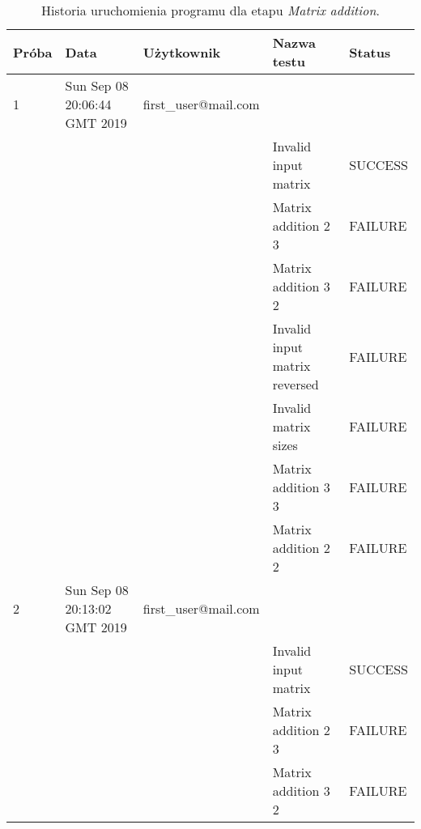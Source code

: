 \begin{center}

\scriptsize

\begin{longtable}{|l|l|l|l|l|}
    \caption{Historia uruchomienia programu dla etapu \textit{Matrix addition}.}
    \label{tab:matrix_addition} \\\hline

    \hline
    \rowcolor[HTML]{EFEFEF}
    \textbf{Próba}  & \textbf{Data}                 & \textbf{Użytkownik}                   & \textbf{Nazwa testu}                     & \textbf{Status}  \\ \hline
    1     & Sun Sep 08 20:06:44 GMT 2019 & first\_user@mail.com &                               &         \\ \hline
    &                              &                                 & Invalid input matrix          & SUCCESS \\ \hline
    &                              &                                 & Matrix addition 2 3           & FAILURE \\ \hline
    &                              &                                 & Matrix addition 3 2           & FAILURE \\ \hline
    &                              &                                 & Invalid input matrix reversed & FAILURE \\ \hline
    &                              &                                 & Invalid matrix sizes          & FAILURE \\ \hline
    &                              &                                 & Matrix addition 3 3           & FAILURE \\ \hline
    &                              &                                 & Matrix addition 2 2           & FAILURE \\ \hline
    2     & Sun Sep 08 20:13:02 GMT 2019 & first\_user@mail.com &                               &         \\ \hline
    &                              &                                 & Invalid input matrix          & SUCCESS \\ \hline
    &                              &                                 & Matrix addition 2 3           & FAILURE \\ \hline
    &                              &                                 & Matrix addition 3 2           & FAILURE \\ \hline

\end{longtable}
\end{center}
